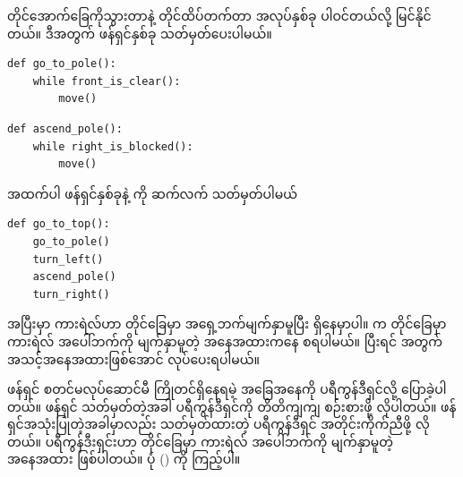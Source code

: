 %
တိုင်အောက်ခြေကိုသွားတာနဲ့ တိုင်ထိပ်တက်တာ အလုပ်နှစ်ခု ပါဝင်တယ်လို့ မြင်နိုင်တယ်။ ဒီအတွက် ဖန်ရှင်နှစ်ခု သတ်မှတ်ပေးပါမယ်။
%
\setlength{\fboxsep}{0pt}
\begin{verbatim}
def go_to_pole():
    while front_is_clear():
        move()
\end{verbatim}
%
\betweenminted{\medskipamount}
%
\setlength{\fboxsep}{0pt}
\begin{verbatim}
def ascend_pole():
    while right_is_blocked():
        move()
\end{verbatim}
%
အထက်ပါ ဖန်ရှင်နှစ်ခုနဲ့  ကို ဆက်လက် သတ်မှတ်ပါမယ်
%
\setlength{\fboxsep}{0pt}
\begin{verbatim}
def go_to_top():
    go_to_pole()
    turn_left()
    ascend_pole()
    turn_right()
\end{verbatim}
%
 အပြီးမှာ ကားရဲလ်ဟာ တိုင်ခြေမှာ အရှေ့ဘက်မျက်နှာမူပြီး ရှိနေမှာပါ။  က တိုင်ခြေမှာ ကားရဲလ် အပေါ်ဘက်ကို မျက်နှာမူတဲ့ အနေအထားကနေ စရပါမယ်။  ပြီးရင်  အတွက် အသင့်အနေအထားဖြစ်အောင်  လုပ်ပေးရပါမယ်။

ဖန်ရှင် စတင်မလုပ်ဆောင်မီ ကြိုတင်ရှိနေရမဲ့ အခြေအနေကို ပရီကွန်ဒီရှင်လို့ ပြောခဲ့ပါတယ်။ ဖန်ရှင် သတ်မှတ်တဲ့အခါ ပရီကွန်ဒီရှင်ကို တိတိကျကျ စဉ်းစားဖို့ လိုပါတယ်။ ဖန်ရှင်အသုံးပြုတဲ့အခါမှာလည်း သတ်မှတ်ထားတဲ့ ပရီကွန်ဒီရှင် အတိုင်းကိုက်ညီဖို့ လိုတယ်။  ပရီကွန်ဒီးရှင်းဟာ တိုင်ခြေမှာ ကားရဲလ် အပေါ်ဘက်ကို မျက်နှာမူတဲ့ အနေအထား ဖြစ်ပါတယ်။ ပုံ \fRefNo{\ref{fig:mutp_pre_and_post}} () ကို ကြည့်ပါ။ %

